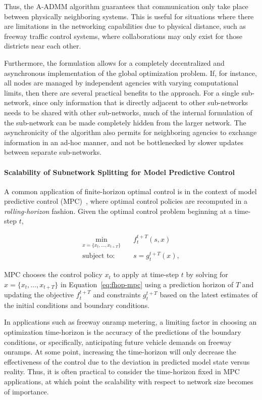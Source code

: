 Thus, the A-ADMM algorithm guarantees that communication only take place between physically neighboring systems. This is useful for situations where there are limitations in the networking capabilities due to physical distance, such as freeway traffic control systems, where collaborations may only exist for those districts near each other.

Furthermore, the formulation allows for a completely decentralized and asynchronous implementation of the global optimization problem. If, for instance, all nodes are managed by independent agencies with varying computational limits, then there are several practical benefits to the approach. For a single sub-network, since only information that is directly adjacent to other sub-networks needs to be shared with other sub-networks, much of the internal formulation of the sub-network can be made completely hidden from the larger network. The asynchronicity of the algorithm also permits for neighboring agencies to exchange information in an ad-hoc manner, and not be bottlenecked by slower updates between separate sub-networks.

\paragraph*{Scalability of Subnetwork Splitting for Model Predictive Control}

A common application of finite-horizon optimal control is in the context of model predictive control (MPC)~\cite{Reilly2013AdjointBased,Frejo2011Feasible}, where optimal control policies are recomputed in a \emph{rolling-horizon} fashion. Given the optimal control problem beginning at a time-step $t$,
 
\begin{align}
	\label{eq:fhop-mpc}
	\min_{x = \{x_t,\ldots, x_{t + T}\}} & \quad f_t^{t + T}\left(s, x\right) \\
	\text{subject to:} & \quad s = g_t^{t + T}\left(x\right) \nonumber,
\end{align}

MPC chooses the control policy $x_t$ to apply at time-step $t$ by solving for $x = \{x_t,\ldots, x_{t + T}\}$ in Equation~\eqref{eq:fhop-mpc} using a prediction horizon of $T$ and updating the objective $f_t^{t+T}$ and constraints $g_{t}^{t + T}$ based on the latest estimates of the initial conditions and boundary conditions.

In applications such as freeway onramp metering, a limiting factor in choosing an optimization time-horizon is the accuracy of the predictions of the boundary conditions, or specifically, anticipating future vehicle demands on freeway onramps. At some point, increasing the time-horizon will only decrease the effectiveness of the control due to the deviation in predicted model state versus reality. Thus, it is often practical to consider the time-horizon fixed in MPC applications, at which point the scalability with respect to network size becomes of importance.

